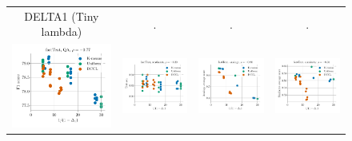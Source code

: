 \begin{figure}
\begin{tabular}{@{\hskip -0.0in}c@{\hskip -0.0in}c@{\hskip -0.0in}c@{\hskip -0.0in}c@{\hskip -0.0in}}
		DELTA1 (Tiny lambda) & . & . & . \\
		\includegraphics[width=.245\linewidth]{figures/fasttext1m_qa_best-f1_vs_gram-large-dim-delta1-2-trans_linx.pdf} &
		\includegraphics[width=.245\linewidth]{figures/fasttext1m_sentiment_trec_test-acc_vs_gram-large-dim-delta1-2-trans_linx.pdf} &
		\includegraphics[width=.245\linewidth]{figures/fasttext1m_intrinsics_analogy-avg-score_vs_gram-large-dim-delta1-2-trans_linx.pdf} &
		\includegraphics[width=.245\linewidth]{figures/fasttext1m_intrinsics_similarity-avg-score_vs_gram-large-dim-delta1-2-trans_linx.pdf} \\		
		

\end{tabular}
\end{figure}
